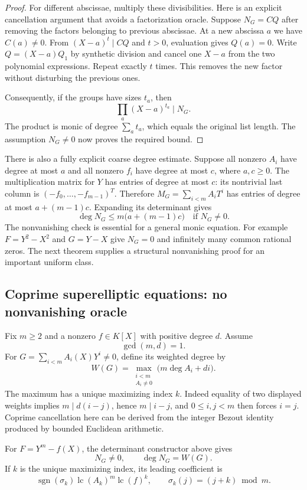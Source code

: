 \begin{proof}
For different abscissae, multiply these divisibilities. Here is an
explicit cancellation argument that avoids a factorization oracle.
Suppose $N_G=CQ$ after removing the factors belonging to previous
abscissae. At a new abscissa $a$ we have $C(a)\ne0$. From
$(X-a)^t\mid CQ$ and $t>0$, evaluation gives $Q(a)=0$. Write
$Q=(X-a)Q_1$ by synthetic division and cancel one $X-a$ from the
two polynomial expressions. Repeat exactly $t$ times. This removes
the new factor without disturbing the previous ones.

Consequently, if the groups have sizes $t_a$, then
\[
               \prod_a(X-a)^{t_a}\mid N_G.
\]
The product is monic of degree $\sum_a t_a$, which equals the
original list length. The assumption $N_G\ne0$ now proves the
required bound.
\end{proof}

There is also a fully explicit coarse degree estimate. Suppose all
nonzero $A_i$ have degree at most $a$ and all nonzero $f_i$ have
degree at most $c$, where $a,c\geq0$. The multiplication matrix for
$Y$ has entries of degree at most $c$: its nontrivial last column
is $(-f_0,\ldots,-f_{m-1})^T$. Therefore
$M_G=\sum_{i<m}A_iT^i$ has entries of degree at most
$a+(m-1)c$. Expanding its determinant gives
\[
              \deg N_G\leq m\bigl(a+(m-1)c\bigr)
                       \quad\text{if }N_G\ne0.
\]
The nonvanishing check is essential for a general monic equation.
For example $F=Y^2-X^2$ and $G=Y-X$ give $N_G=0$ and infinitely
many common rational zeros. The next theorem supplies a structural
nonvanishing proof for an important uniform class.

\subsection{Coprime superelliptic equations: no nonvanishing oracle}

Fix $m\geq2$ and a nonzero $f\in K[X]$ with positive degree $d$.
Assume
\[
                             \gcd(m,d)=1.
\]
For $G=\sum_{i<m}A_i(X)Y^i\ne0$, define its weighted degree by
\[
 W(G)=\max_{\substack{i<m\\A_i\ne0}}
                   \bigl(m\deg A_i+d i\bigr).
\]
The maximum has a unique maximizing index $k$. Indeed equality of
two displayed weights implies $m\mid d(i-j)$, hence $m\mid i-j$,
and $0\leq i,j<m$ then forces $i=j$. Coprime cancellation here can
be derived from the integer Bezout identity produced by bounded
Euclidean arithmetic.

\begin{theorem}
\label{thm:norm-degree}
For $F=Y^m-f(X)$, the determinant constructor above gives
\[
                       N_G\ne0,\qquad \deg N_G=W(G).
\]
If $k$ is the unique maximizing index, its leading coefficient is
\[
 \operatorname{sgn}(\sigma_k)
       \operatorname{lc}(A_k)^m\operatorname{lc}(f)^k,
 \qquad \sigma_k(j)=(j+k)\bmod m.
\]
\end{theorem}

